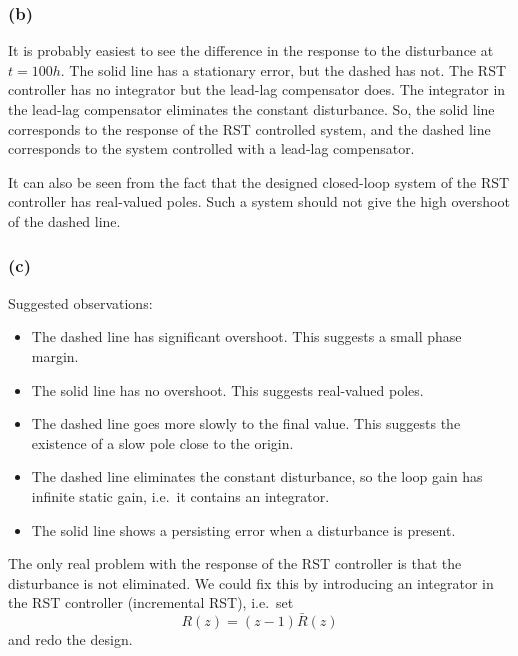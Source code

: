 \documentclass[letterpaper,12pt]{article}
\begin{document}
\subsubsection*{(b)}

It is probably easiest to see the difference in the response to the disturbance at $t=100h$. The solid line has a stationary error, but the dashed has not. The RST controller has no integrator but the lead-lag compensator does. The integrator in the lead-lag compensator eliminates the constant disturbance. So, the solid line corresponds to the response of the RST controlled system, and the dashed line corresponds to the system controlled with a lead-lag compensator.
 
It can also be seen from the fact that the designed closed-loop system of the RST controller has real-valued poles. Such a system should not give the high overshoot of the dashed line. 

\subsubsection*{(c)}

Suggested observations:
\begin{itemize}
\item The dashed line has significant overshoot. This suggests a small phase margin.
\item The solid line has no overshoot. This suggests real-valued poles.
\item The dashed line goes more slowly to the final value. This suggests the existence of a slow pole close to the origin.  
\item The dashed line eliminates the constant disturbance, so the loop gain has infinite static gain, i.e.~it contains an integrator.
\item The solid line shows a persisting error when a disturbance is present. 
\end{itemize}


The only real problem with the response of the RST controller is that the disturbance is not eliminated. We could fix this by introducing an integrator in the RST controller (incremental RST), i.e.~set
\[ R(z) = (z-1)\bar{R}(z)\]
and redo the design.
\end{document}
